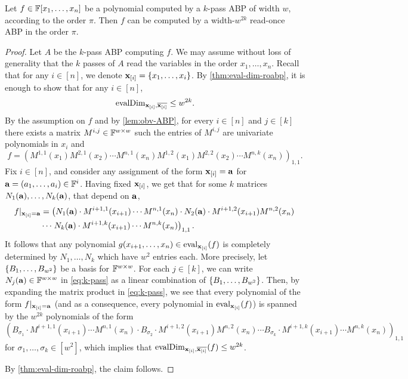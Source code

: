 \documentclass[11pt]{article}
\newcommand{\exi}{\vecx_{[i]}}
\begin{document}
\begin{lemma}\label{lem:k-pass-to-roabp}
Let $f \in \F[x_1, \ldots, x_n]$ be a polynomial computed by a $k$-pass ABP of width $w$, according to the order $\pi$.
Then $f$ can be computed by a width-$w^{2k}$ read-once ABP in the order $\pi$.
\end{lemma}
\begin{proof}
Let $A$ be the $k$-pass ABP computing $f$.  We may assume without loss of generality that the $k$ passes of $A$ read the variables in the order $x_1, \ldots, x_n$. Recall that for any $i \in [n]$, we denote $\exi = \{x_1, \ldots, x_i\}$.  By \autoref{thm:eval-dim-roabp}, it is enough to show that for any $i \in [n]$, 
\[
\evalDim_{\exi, \overline{\exi}} \le w^{2k}.
\] 
By the assumption on $f$ and by \autoref{lem:obv-ABP}, for every $i \in [n]$ and $j \in [k]$ there exists a matrix $M^{i,j} \in \F^{w \times w}$  such the entries of $M^{i,j}$ are univariate polynomials in $x_i$ and
\[
f = \left(  M^{1,1} (x_1) M^{2,1} (x_2) \cdots M^{n,1}(x_n) M^{1,2}(x_1) M^{2,2}(x_2) \cdots M^{n,k} (x_n) \right)_{1,1}.
\]
Fix $i \in [n]$, and consider any assignment of the form $\exi = \veca$ for $\veca=(a_1, \ldots, a_i) \in \F^i$. Having fixed $\exi$, we get that for some $k$ matrices $N_1(\mathbf{a}), \ldots, N_k(\mathbf{a})$, that depend on $\mathbf{a}$,
\begin{align}
\label{eq:k-pass}
f|_{\exi = \veca} &= \left( N_1(\veca) \cdot M^{i+1,1}(x_{i+1}) \cdots M^{n,1}(x_n) \cdot N_2(\veca) \cdot M^{i+1,2}(x_{i+1})  M^{n,2}(x_n)\right. \nonumber \\
&\cdots \left. N_k(\veca) \cdot  M^{i+1,k}(x_{i+1}) \cdots M^{n,k}(x_{n}) \right)_{1,1}.
\end{align}
It follows that any polynomial $g(x_{i+1}, \ldots, x_n) \in \eval_{\exi}(f)$ is completely determined by $N_1, \ldots, N_k$ which have $w^2$ entries each. More precisely, let $\left\{ B_1, \ldots, B_{w^2} \right\}$ be a basis for $\F^{w \times w}$. For each $j \in [k]$, we can write $N_j(\veca) \in \F^{w \times w}$ in \eqref{eq:k-pass} as a linear combination of $\left\{ B_1, \ldots, B_{w^2} \right\}$. Then, by expanding the matrix product in \eqref{eq:k-pass}, we see that every polynomial of the form $f|_{\exi = \veca}$ (and as a consequence, every polynomial in $\eval_{\exi}(f)$) is spanned by the $w^{2k}$ polynomials of the form
\[
\left( B_{\sigma_1} \cdot M^{i+1,1}(x_{i+1}) \cdots M^{n,1}(x_n) \cdot B_{\sigma_2} \cdot M^{i+1,2}(x_{i+1})  M^{n,2}(x_n) \cdots
 B_{\sigma_k} \cdot  M^{i+1,k}(x_{i+1}) \cdots M^{n,k}(x_{n}) \right)_{1,1}
\]
for $\sigma_1,\ldots,\sigma_k \in [w^2]$, which implies that $\evalDim_{\exi, \overline{\exi}}(f) \le w^{2k}$.

By \autoref{thm:eval-dim-roabp}, the claim follows.
\end{proof}
\end{document}

